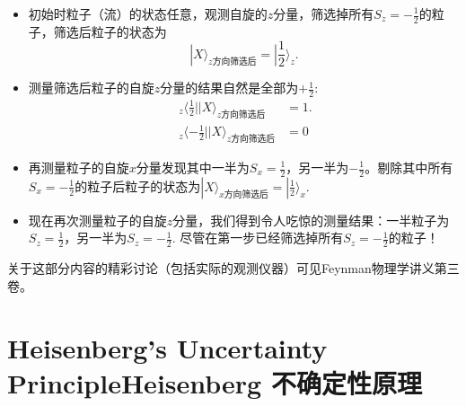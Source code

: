 \begin{itemize}
\item	初始时粒子（流）的状态任意，观测自旋的$z$分量，筛选掉所有$S_z = -\frac{1}{2}$的粒子，筛选后粒子的状态为
	\begin{equation}
		|X\rangle_{z\text{方向筛选后}} = |\frac{1}{2} \rangle_z.
	\label{equ8.58}
	\end{equation}
\item	测量筛选后粒子的自旋$z$分量的结果自然是全部为$+\frac{1}{2}$:
	\begin{align}
		\ _z\langle \frac{1}{2} || X \rangle_{z\text{方向筛选后}} &= 1. 
	\label{equ8.59} \\
		\ _z \langle -\frac{1}{2} | |X \rangle_{z\text{方向筛选后}} &= 0
	\label{equ8.60}
	\end{align}
\item	再测量粒子的自旋$x$分量发现其中一半为$S_x = \frac{1}{2}$，另一半为$-\frac{1}{2}$。剔除其中所有$S_x = -\frac{1}{2}$的粒子后粒子的状态为$|X\rangle_{x\text{方向筛选后}} = |\frac{1}{2} \rangle_x$.
\item 	现在再次测量粒子的自旋$z$分量，我们得到令人吃惊的测量结果：一半粒子为$S_z = \frac{1}{2}$，另一半为$S_z = -\frac{1}{2}$. 尽管在第一步已经筛选掉所有$S_z = -\frac{1}{2}$的粒子！
\end{itemize}
关于这部分内容的精彩讨论（包括实际的观测仪器）可见Feynman物理学讲义第三卷。

\section[Heisenberg 不确定性原理]{Heisenberg’s Uncertainty PrincipleHeisenberg 不确定性原理}\label{sec8.6}

